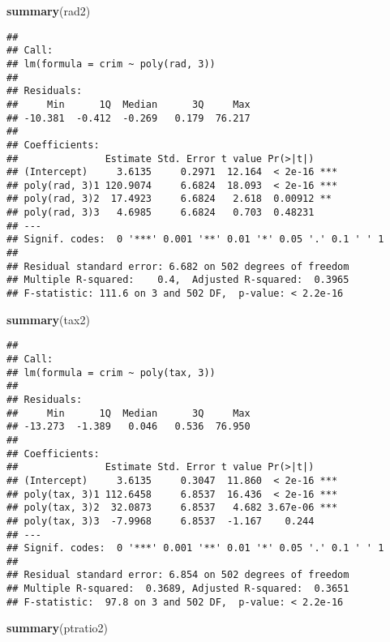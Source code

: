 \documentclass[]{article}
\newenvironment{Shaded}{\begin{snugshade}}{\end{snugshade}}
\newcommand{\KeywordTok}[1]{\textcolor[rgb]{0.13,0.29,0.53}{\textbf{#1}}}
\newcommand{\NormalTok}[1]{#1}
\begin{document}
\begin{Shaded}
\begin{Highlighting}[]
\KeywordTok{summary}\NormalTok{(rad2)}
\end{Highlighting}
\end{Shaded}

\begin{verbatim}
## 
## Call:
## lm(formula = crim ~ poly(rad, 3))
## 
## Residuals:
##     Min      1Q  Median      3Q     Max 
## -10.381  -0.412  -0.269   0.179  76.217 
## 
## Coefficients:
##               Estimate Std. Error t value Pr(>|t|)    
## (Intercept)     3.6135     0.2971  12.164  < 2e-16 ***
## poly(rad, 3)1 120.9074     6.6824  18.093  < 2e-16 ***
## poly(rad, 3)2  17.4923     6.6824   2.618  0.00912 ** 
## poly(rad, 3)3   4.6985     6.6824   0.703  0.48231    
## ---
## Signif. codes:  0 '***' 0.001 '**' 0.01 '*' 0.05 '.' 0.1 ' ' 1
## 
## Residual standard error: 6.682 on 502 degrees of freedom
## Multiple R-squared:    0.4,  Adjusted R-squared:  0.3965 
## F-statistic: 111.6 on 3 and 502 DF,  p-value: < 2.2e-16
\end{verbatim}

\begin{Shaded}
\begin{Highlighting}[]
\KeywordTok{summary}\NormalTok{(tax2)}
\end{Highlighting}
\end{Shaded}

\begin{verbatim}
## 
## Call:
## lm(formula = crim ~ poly(tax, 3))
## 
## Residuals:
##     Min      1Q  Median      3Q     Max 
## -13.273  -1.389   0.046   0.536  76.950 
## 
## Coefficients:
##               Estimate Std. Error t value Pr(>|t|)    
## (Intercept)     3.6135     0.3047  11.860  < 2e-16 ***
## poly(tax, 3)1 112.6458     6.8537  16.436  < 2e-16 ***
## poly(tax, 3)2  32.0873     6.8537   4.682 3.67e-06 ***
## poly(tax, 3)3  -7.9968     6.8537  -1.167    0.244    
## ---
## Signif. codes:  0 '***' 0.001 '**' 0.01 '*' 0.05 '.' 0.1 ' ' 1
## 
## Residual standard error: 6.854 on 502 degrees of freedom
## Multiple R-squared:  0.3689, Adjusted R-squared:  0.3651 
## F-statistic:  97.8 on 3 and 502 DF,  p-value: < 2.2e-16
\end{verbatim}

\begin{Shaded}
\begin{Highlighting}[]
\KeywordTok{summary}\NormalTok{(ptratio2)}
\end{Highlighting}
\end{Shaded}
\end{document}
